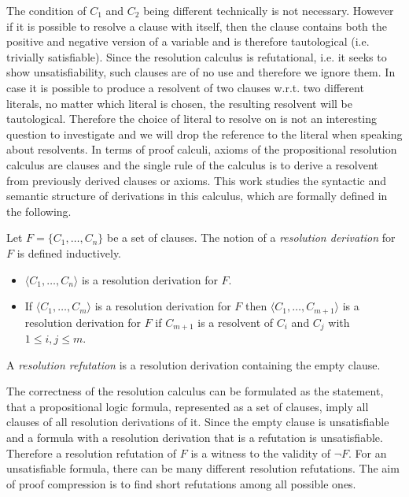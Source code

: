 The condition of $C_1$ and $C_2$ being different technically is not necessary.
However if it is possible to resolve a clause with itself, then the clause contains both the positive and negative version of a variable and is therefore tautological (i.e. trivially satisfiable).
Since the resolution calculus is refutational, i.e. it seeks to show unsatisfiability, such clauses are of no use and therefore we ignore them.
In case it is possible to produce a resolvent of two clauses w.r.t. two different literals, no matter which literal is chosen, the resulting resolvent will be tautological.
Therefore the choice of literal to resolve on is not an interesting question to investigate and we will drop the reference to the literal when speaking about resolvents.
In terms of proof calculi, axioms of the propositional resolution calculus are clauses and the single rule of the calculus is to derive a resolvent from previously derived clauses or axioms.
This work studies the syntactic and semantic structure of derivations in this calculus, which are formally defined in the following.

\begin{definition}

Let $F = \{C_1, \ldots, C_n\}$ be a set of clauses.
The notion of a \emph{resolution derivation} for $F$ is defined inductively.
\begin{itemize}
	\item $\langle C_1, \ldots, C_n\rangle$ is a resolution derivation for $F$.
	\item If $\langle C_1, \ldots, C_m\rangle$ is a resolution derivation for $F$ then $\langle C_1, \ldots, C_{m+1} \rangle$ is a resolution derivation for $F$ if $C_{m+1}$ is a resolvent of $C_i$ and $C_j$ with $1 \leq i,j \leq m$.
\end{itemize}
A \emph{resolution refutation} is a resolution derivation containing the empty clause.

\end{definition}

The correctness of the resolution calculus can be formulated as the statement, that a propositional logic formula, represented as a set of clauses, imply all clauses of all resolution derivations of it. 
Since the empty clause is unsatisfiable and a formula with a resolution derivation that is a refutation is unsatisfiable.
Therefore a resolution refutation of $F$ is a witness to the validity of $\neg F$.
For an unsatisfiable formula, there can be many different resolution refutations.
The aim of proof compression is to find short refutations among all possible ones.


